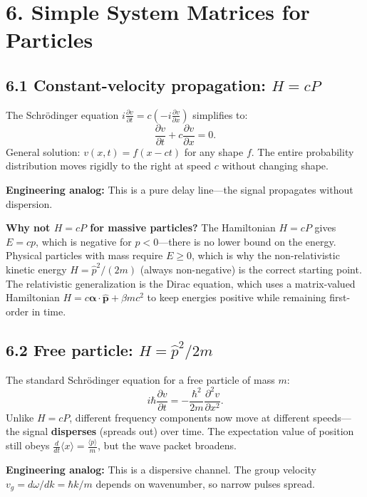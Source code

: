 \documentclass[12pt,a4paper]{article}
\begin{document}
\section{6. Simple System Matrices for Particles}

\subsection{6.1 Constant-velocity propagation: $H=cP$}
The Schr\"odinger equation $i\frac{\partial v}{\partial t}=c(-i\frac{\partial v}{\partial x})$ simplifies to:
\[
    \frac{\partial v}{\partial t} + c\frac{\partial v}{\partial x} = 0.
\]
General solution: $v(x,t)=f(x-ct)$ for any shape $f$.  The entire probability distribution moves rigidly to the right at speed $c$ without changing shape.

\medskip
\noindent\textbf{Engineering analog:} This is a pure delay line---the signal propagates without dispersion.

\medskip
\noindent\textbf{Why not $H=cP$ for massive particles?}  The Hamiltonian $H=cP$ gives $E=cp$, which is negative for $p<0$---there is no lower bound on the energy.  Physical particles with mass require $E\geq 0$, which is why the non-relativistic kinetic energy $H=\hat{p}^2/(2m)$ (always non-negative) is the correct starting point.  The relativistic generalization is the Dirac equation, which uses a matrix-valued Hamiltonian $H = c\boldsymbol{\alpha}\cdot\hat{\mathbf{p}}+\beta mc^2$ to keep energies positive while remaining first-order in time.

\subsection{6.2 Free particle: $H=\hat{p}^2/2m$}
The standard Schr\"odinger equation for a free particle of mass $m$:
\[
    \boxed{i\hbar\frac{\partial v}{\partial t} = -\frac{\hbar^2}{2m}\frac{\partial^2 v}{\partial x^2}.}
\]
Unlike $H=cP$, different frequency components now move at different speeds---the signal \textbf{disperses} (spreads out) over time.  The expectation value of position still obeys $\frac{d}{dt}\langle x \rangle=\frac{\langle p \rangle}{m}$, but the wave packet broadens.

\medskip
\noindent\textbf{Engineering analog:} This is a dispersive channel.  The group velocity $v_g = d\omega/dk = \hbar k/m$ depends on wavenumber, so narrow pulses spread.
\end{document}
